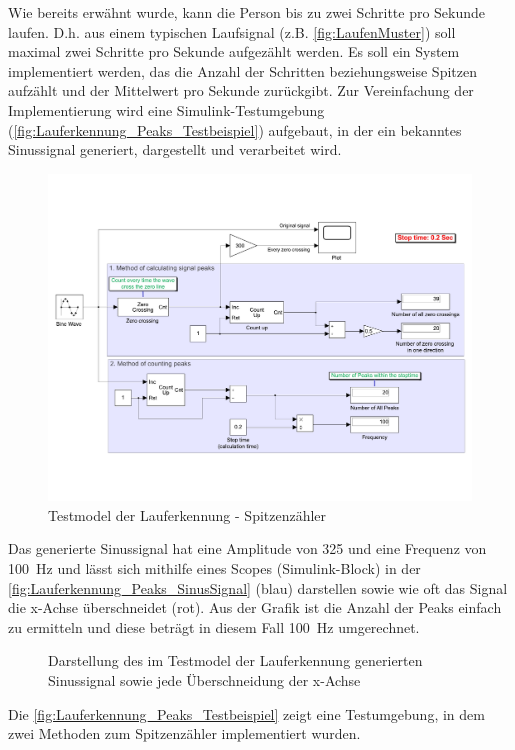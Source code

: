 Wie bereits erwähnt wurde, kann die Person bis zu zwei Schritte pro Sekunde laufen. D.h. aus einem typischen Laufsignal (z.B. \autoref{fig:LaufenMuster}) soll maximal zwei Schritte pro Sekunde aufgezählt werden.
Es soll ein System implementiert werden, das die Anzahl der Schritten beziehungsweise Spitzen aufzählt und der Mittelwert pro Sekunde zurückgibt. Zur Vereinfachung der Implementierung wird eine Simulink-Testumgebung (\autoref{fig:Lauferkennung_Peaks_Testbeispiel}) aufgebaut, in der ein bekanntes Sinussignal generiert, dargestellt und verarbeitet wird.
\begin{figure}
	\centering
	\includegraphics[width=0.8\linewidth]{Bilder/TestModellLauferkennungSpitzenzaehler.pdf}
	\caption{Testmodel der Lauferkennung - Spitzenzähler}
	\label{fig:Lauferkennung_Peaks_Testbeispiel}
\end{figure}
Das generierte Sinussignal hat eine Amplitude von 325 und eine Frequenz von \SI{100}{\hertz} und lässt sich mithilfe eines Scopes (Simulink-Block) in der \autoref{fig:Lauferkennung_Peaks_SinusSignal} (blau) darstellen sowie wie oft das Signal die x-Achse überschneidet (rot). Aus der Grafik ist die Anzahl der Peaks einfach zu ermitteln und diese beträgt in diesem Fall \SI{100}{\hertz} umgerechnet.

\begin{figure}
	\centering
	\caption{Darstellung des im Testmodel der Lauferkennung generierten Sinussignal sowie jede Überschneidung der x-Achse}
	\label{fig:Lauferkennung_Peaks_SinusSignal}
\end{figure}
Die \autoref{fig:Lauferkennung_Peaks_Testbeispiel} zeigt eine Testumgebung, in dem zwei Methoden zum Spitzenzähler implementiert wurden.


